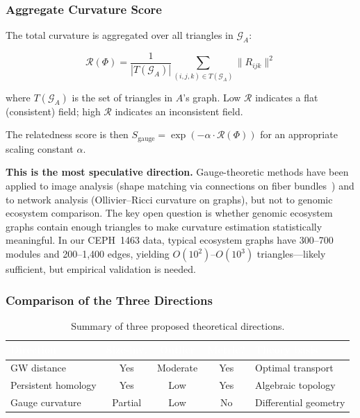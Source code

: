 \documentclass{../yalumba}
\begin{document}
\subsubsection{Aggregate Curvature Score}

The total curvature is aggregated over all triangles in $\mathcal{G}_A$:

\begin{equation}
  \mathcal{R}(\Phi) = \frac{1}{|T(\mathcal{G}_A)|}
  \sum_{(i,j,k) \in T(\mathcal{G}_A)} \|R_{ijk}\|^2
  \label{eq:total_curvature}
\end{equation}

where $T(\mathcal{G}_A)$ is the set of triangles in $A$'s graph.  Low
$\mathcal{R}$ indicates a flat (consistent) field; high $\mathcal{R}$
indicates an inconsistent field.

The relatedness score is then $S_{\mathrm{gauge}} = \exp(-\alpha \cdot
\mathcal{R}(\Phi))$ for an appropriate scaling constant $\alpha$.

\begin{limitation}
\textbf{This is the most speculative direction.}  Gauge-theoretic
methods have been applied to image analysis (shape matching via
connections on fiber bundles~\cite{nakahara2003geometry}) and to network
analysis (Ollivier--Ricci curvature on graphs), but not to genomic
ecosystem comparison.  The key open question is whether genomic
ecosystem graphs contain enough triangles to make curvature estimation
statistically meaningful.  In our CEPH~1463 data, typical ecosystem
graphs have 300--700 modules and 200--1{,}400 edges, yielding
$O(10^2)$--$O(10^3)$ triangles---likely sufficient, but empirical
validation is needed.
\end{limitation}

\subsubsection{Comparison of the Three Directions}

\begin{table}[H]
  \centering
  \tablestyle
  \caption{Summary of three proposed theoretical directions.}
  \label{tab:three_directions}
  \begin{tabular}{lcccl}
    \toprule
    \rowcolor{table-header}
    \textcolor{white}{\textbf{Direction}} &
    \textcolor{white}{\textbf{Size-inv.}} &
    \textcolor{white}{\textbf{Outlier}} &
    \textcolor{white}{\textbf{Metric?}} &
    \textcolor{white}{\textbf{Theory basis}} \\
    \midrule
    GW distance & Yes & Moderate & Yes & Optimal transport \\
    Persistent homology & Yes & Low & Yes & Algebraic topology \\
    Gauge curvature & Partial & Low & No & Differential geometry \\
    \bottomrule
  \end{tabular}
\end{table}
\end{document}
